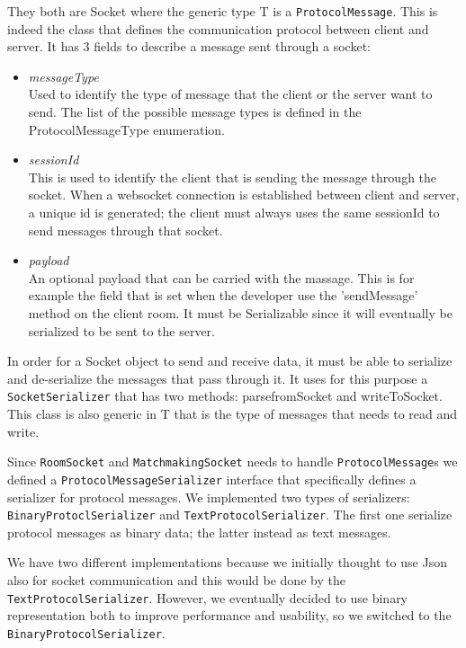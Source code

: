 They both are Socket where the generic type T is a \texttt{ProtocolMessage}. This is indeed the class that defines the communication protocol between client and server. It has 3 fields to describe a message sent through a socket:
\begin{itemize}
	\item \textit{messageType} \\
	Used to identify the type of message that the client or the server want to send. The list of the possible message types is defined in the ProtocolMessageType enumeration.
	\item \textit{sessionId} \\
	This is used to identify the client that is sending the message through the socket. When a websocket connection is established between client and server, a unique id is generated; the client must always uses the same sessionId to send messages through that socket.
	\item \textit{payload} \\ 
	An optional payload that can be carried with the massage. This is for example the field that is set when the developer use the 'sendMessage' method on the client room. It must be Serializable since it will eventually be serialized to be sent to the server.
\end{itemize}

In order for a Socket object to send and receive data, it must be able to serialize and de-serialize the messages that pass through it. It uses for this purpose a \texttt{SocketSerializer} that has two methods: parsefromSocket and writeToSocket. This class is also generic in T that is the type of messages that needs to read and write.

Since \texttt{RoomSocket} and \texttt{MatchmakingSocket} needs to handle \texttt{ProtocolMessage}s we defined a \texttt{ProtocolMessageSerializer} interface that specifically defines a serializer for protocol messages. We implemented two types of serializers: \texttt{BinaryProtoclSerializer} and \texttt{TextProtocolSerializer}. The first one serialize protocol messages as binary data; the latter instead as text messages.
 
We have two different implementations because we initially thought to use Json also for socket communication and this would be done by the \texttt{TextProtocolSerializer}. However, we eventually decided to use binary representation both to improve performance and usability, so we switched to the \texttt{BinaryProtocolSerializer}.


